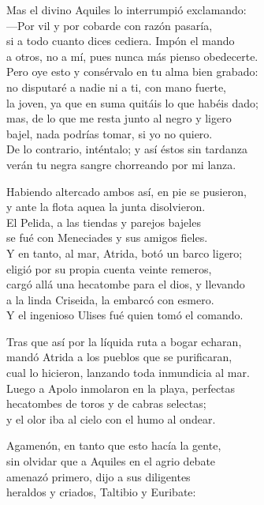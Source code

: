 Mas el divino Aquiles lo interrumpió exclamando:\\
---Por vil y por cobarde con razón pasaría,\\
si a todo cuanto dices cediera. Impón el mando\\
a otros, no a mí, pues nunca más pienso obedecerte.\\
Pero oye esto y consérvalo en tu alma bien grabado:\\
no disputaré a nadie ni a ti, con mano fuerte,\\
la joven, ya que en suma quitáis lo que habéis dado;\\
mas, de lo que me resta junto al negro y ligero\\
bajel, nada podrías tomar, si yo no quiero.\\
De lo contrario, inténtalo; y así éstos sin tardanza\\
verán tu negra sangre chorreando por mi lanza.\par
Habiendo altercado ambos así, en pie se pusieron,\\
y ante la flota aquea la junta disolvieron.\\
El Pelida, a las tiendas y parejos bajeles\\
se fué con Meneciades y sus amigos fieles.\\
Y en tanto, al mar, Atrida, botó un barco ligero;\\
eligió por su propia cuenta veinte remeros,\\
cargó allá una hecatombe para el dios, y llevando\\
a la linda Criseida, la embarcó con esmero.\\
Y el ingenioso Ulises fué quien tomó el comando.\par
Tras que así por la líquida ruta a bogar echaran,\\
mandó Atrida a los pueblos que se purificaran,\\
cual lo hicieron, lanzando toda inmundicia al mar.\\
Luego a Apolo inmolaron en la playa, perfectas\\
hecatombes de toros y de cabras selectas;\\
y el olor iba al cielo con el humo al ondear.\par
Agamenón, en tanto que esto hacía la gente,\\
sin olvidar que a Aquiles en el agrio debate\\
amenazó primero, dijo a sus diligentes\\
heraldos y criados, Taltibio y Euribate:\par
